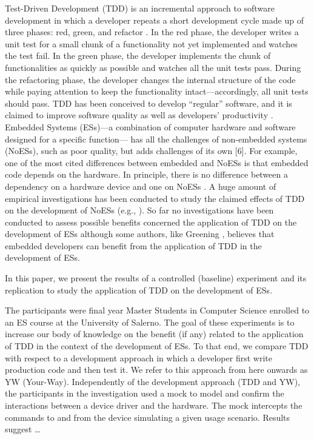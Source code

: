 Test-Driven Development (TDD) is an incremental approach to software development in which a developer repeats a short development cycle made up of three phases: red, green, and refactor \cite{TDDByExample}. In the red phase, the developer writes a unit test for a small chunk of a functionality not yet implemented and watches the test fail. In the green phase, the developer implements the chunk of functionalities as quickly as possible and watches all the unit tests pass. During the refactoring phase, the developer changes the internal structure of the code while paying attention to keep the functionality intact—accordingly, all unit tests should pass. TDD has been conceived to develop “regular” software, and it is claimed to improve software quality as well as developers' productivity \cite{DBLP:reference/se/ErdogmusMJ10}. Embedded Systems (ESs)—a combination of computer hardware and software designed for a specific function— has all the challenges of non-embedded systems (NoESs), such as poor quality, but adds challenges of its own [6]. 
For example, one of the most cited differences between embedded and NoESs is that embedded code depends on the hardware. In principle, there is no difference between a dependency on a hardware device and one on NoESs \cite{TDDEC}. A huge amount of empirical investigations has been conducted to study the claimed effects of TDD on the development of NoESs (e.g., \cite{DBLP:journals/software/KaracT18}). So far no investigations have been conducted to assess possible benefits concerned the application of TDD on the development of ESs although some authors, like Greening \cite{TDDEC}, believes that embedded developers can benefit from the application of TDD in the development of ESs.

In this paper, we present the results of a controlled (baseline) experiment and its replication to study the application of TDD on the development of ESs.

The participants were final year Master Students in Computer Science enrolled to an ES course at the University of Salerno. The goal of these experiments is to increase our body of knowledge on the benefit (if any) related to the application of TDD in the context of the development of ESs. To that end, we compare TDD with respect to a development approach in which a developer first write production code and then test it. We refer to this approach from here onwards as YW (Your-Way). Independently of the development approach (TDD and YW), the participants in the investigation used a mock to model and confirm the interactions between a device driver and the hardware. The mock intercepts the commands to and from the device simulating a given usage scenario. Results suggest \dots


